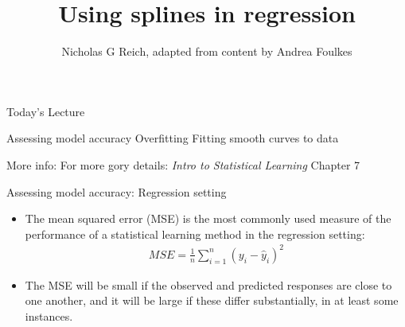 \documentclass[table]{beamer}\usepackage[]{graphicx}\usepackage[]{color}
\title{Using splines in regression}
\author{Nicholas G Reich, adapted from content by Andrea Foulkes}
\begin{document}
\begin{frame}[plain]
        \titlepage
\end{frame}





\begin{frame}{Today's Lecture}

\bi
    \myitem Assessing model accuracy
    \myitem Overfitting
    \myitem Fitting smooth curves to data
\ei

\vspace{2em}

More info:
\bi
    \myitem For more gory details: {\em Intro to Statistical Learning} Chapter 7
\ei


\end{frame}


\begin{frame}{Assessing model accuracy: Regression setting}
\begin{itemize}
\item The {\color{orange} mean squared error (MSE)} is the most commonly used measure of the performance of a statistical learning method in the regression setting:
%
\begin{eqnarray*}
MSE = \frac{1}{n} \sum_{i=1}^n \left(y_i -\hat y_i\right)^2
\end{eqnarray*}

\bigskip
\item The MSE will be small if the observed and predicted responses are close to one another, and it will be large if these differ substantially, in at least some instances.
\end{itemize}
\end{frame}


\end{document}
